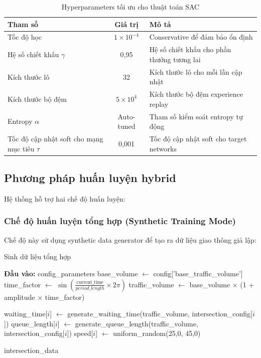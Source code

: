 \begin{table}[!htp]
\centering
\caption{Hyperparameters tối ưu cho thuật toán SAC}
\label{tab:sac_hyperparameters}
\begin{tabular}{|l|c|p{5cm}|}
\hline
\textbf{Tham số} & \textbf{Giá trị} & \textbf{Mô tả} \\
\hline
Tốc độ học & $1 \times 10^{-4}$ & Conservative để đảm bảo ổn định \\
\hline
Hệ số chiết khấu $\gamma$ & 0,95 & Hệ số chiết khấu cho phần thưởng tương lai \\
\hline
Kích thước lô & 32 & Kích thước lô cho mỗi lần cập nhật \\
\hline
Kích thước bộ đệm & $5 \times 10^{4}$ & Kích thước bộ đệm experience replay \\
\hline
Entropy $\alpha$ & Auto-tuned & Tham số kiểm soát entropy tự động \\
\hline
Tốc độ cập nhật soft cho mạng mục tiêu $\tau$ & 0,001 & Tốc độ cập nhật soft cho target networks \\
\hline
\end{tabular}
\end{table}

\subsection{Phương pháp huấn luyện hybrid}
Hệ thống hỗ trợ hai chế độ huấn luyện:

\subsubsection{Chế độ huấn luyện tổng hợp (Synthetic Training Mode)}
Chế độ này sử dụng synthetic data generator để tạo ra dữ liệu giao thông giả lập:

\begin{algorithm}[!htp]
    \caption{Sinh dữ liệu tổng hợp}
    \begin{algorithmic}[1]
        \State \textbf{Đầu vào:} config\_parameters
        \State base\_volume $\leftarrow$ config['base\_traffic\_volume'] 
        \State time\_factor $\leftarrow$ $\sin(\frac{\text{current\_time}}{period\_length} \times 2\pi)$
        \State traffic\_volume $\leftarrow$ base\_volume $\times$ (1 + amplitude $\times$ time\_factor) 
        
            \State waiting\_time[$i$] $\leftarrow$ generate\_waiting\_time(traffic\_volume, intersection\_config[$i$])
            \State queue\_length[$i$] $\leftarrow$ generate\_queue\_length(traffic\_volume, intersection\_config[$i$])
            \State speed[$i$] $\leftarrow$ uniform\_random(25,0, 45,0) 
        \EndFor 
        
        \State \Return intersection\_data
    \end{algorithmic}
\end{algorithm}

